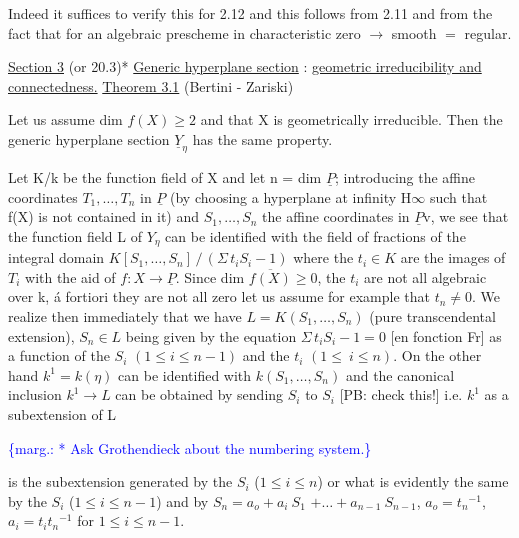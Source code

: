 \documentclass[11pt]{article}
\newcommand{\scanpage}[1]{\par\bigskip\noindent{\small\sffamily[scan #1]}\par}
\newcommand{\mspage}[1]{{\small\sffamily[p.\,#1]}}
\newcommand{\margin}[1]{\textcolor{blue}{\{\textsf{marg.:} #1\}}}
\newcommand{\uline}[1]{\underline{#1}}
\begin{document}
Indeed it suffices to verify this for 2.12 and this follows
from 2.11 and from the fact that for an algebraic prescheme in
characteristic zero $\rightarrow$ smooth $=$ regular.

\uline{Section 3} (or 20.3)*
\uline{Generic hyperplane section} : \uline{geometric irreducibility and}
\uline{connectedness.}
\uline{Theorem 3.1} (Bertini - Zariski)

Let us assume dim $f(X) \geq 2$ and that X is geometrically
irreducible. Then the generic hyperplane section $\underline{Y}_{\eta}$ has the same
property.

Let K/k be the function field of X and let n = dim $\underline{P}$;
introducing the affine coordinates $T_1,\dots,T_n$ in $\underline{P}$ (by choosing a
hyperplane at infinity H$\infty$ such that f(X) is not contained in it)
and $S_1,\dots,S_n$ the affine coordinates in $\underline{P}$v, we see that the
function field L of $Y_{\eta}$ can be identified with the field of
fractions of the integral domain $K[S_1,\dots,S_n] \,/\, (\Sigma\, t_iS_i - 1)$ where
the $t_i \in K$ are the images of $T_i$ with the aid of $f{:}X \rightarrow \underline{P}$. Since
dim $\overline{f(X)} \geq 0$, the $t_i$ are not all algebraic over k, á fortiori they
are not all zero let us assume for example that $t_n \neq 0$. We realize
then immediately that we have $L = K(S_1,\dots,S_n)$ (pure transcendental
extension), $S_n \in L$ being given by the equation $\Sigma\, t_iS_i - 1 = 0$
[en fonction Fr] as a function of the $S_i$ $(1 \leq i \leq n - 1)$ and the $t_i$
$(1 \leq\ i \leq n)$. On the other hand $k^1 = k(\eta)$ can be identified with
$k(S_1,\dots,S_n)$ and the canonical inclusion $k^1 \rightarrow L$ can be obtained by
sending $S_i$ to $S_i$ [PB: check this!] i.e. $k^1$ as a subextension of L

\margin{* Ask Grothendieck about the numbering system.}

\clearpage
\scanpage{24/20}
\mspage{20}

is the subextension generated by the $S_i$ ($1 \leq i \leq n$) or what is
evidently the same by the $S_i$ ($1 \leq i \leq n - 1$) and by $S_n = a_o + a_i\ S_1$
$+\ldots+a_{n-1}\ S_{n-1}$, $a_o = t_n{}^{-1}$, $a_i = t_it_n{}^{-1}$ for $1 \leq i \leq n - 1$.
\end{document}
